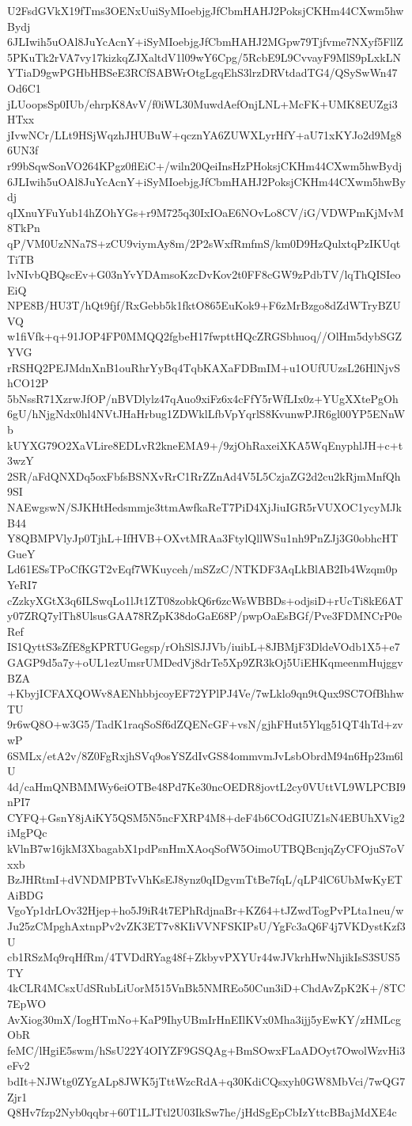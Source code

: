 U2FsdGVkX19fTms3OENxUuiSyMIoebjgJfCbmHAHJ2PoksjCKHm44CXwm5hwBydj
6JLIwih5uOAl8JuYcAcnY+iSyMIoebjgJfCbmHAHJ2MGpw79Tjfvme7NXyf5FllZ
5PKuTk2rVA7vy17kizkqZJXaltdV1l09wY6Cpg/5RcbE9L9CvvayF9MlS9pLxkLN
YTiaD9gwPGHbHBSeE3RCfSABWrOtgLgqEhS3lrzDRVtdadTG4/QSySwWn47Od6C1
jLUoopsSp0IUb/ehrpK8AvV/f0iWL30MuwdAefOnjLNL+McFK+UMK8EUZgi3HTxx
jIvwNCr/LLt9HSjWqzhJHUBuW+qcznYA6ZUWXLyrHfY+aU71xKYJo2d9Mg86UN3f
r99bSqwSonVO264KPgz0flEiC+/wiln20QeiInsHzPHoksjCKHm44CXwm5hwBydj
6JLIwih5uOAl8JuYcAcnY+iSyMIoebjgJfCbmHAHJ2PoksjCKHm44CXwm5hwBydj
qIXnuYFuYub14hZOhYGs+r9M725q30IxIOaE6NOvLo8CV/iG/VDWPmKjMvM8TkPn
qP/VM0UzNNa7S+zCU9viymAy8m/2P2sWxfRmfmS/km0D9HzQulxtqPzIKUqtTiTB
lvNIvbQBQscEv+G03nYvYDAmsoKzcDvKov2t0FF8cGW9zPdbTV/lqThQISIeoEiQ
NPE8B/HU3T/hQt9fjf/RxGebb5k1fktO865EuKok9+F6zMrBzgo8dZdWTryBZUVQ
w1fiVfk+q+91JOP4FP0MMQQ2fgbeH17fwpttHQcZRGSbhuoq//OlHm5dybSGZYVG
rRSHQ2PEJMdnXnB1ouRhrYyBq4TqbKAXaFDBmIM+u1OUfUUzsL26HlNjvShCO12P
5bNssR71XzrwJfOP/nBVDlylz47qAuo9xiFz6x4cFfY5rWfLIx0z+YUgXXtePgOh
6gU/hNjgNdx0hl4NVtJHaHrbug1ZDWklLfbVpYqrlS8KvunwPJR6gl00YP5ENnWb
kUYXG79O2XaVLire8EDLvR2kneEMA9+/9zjOhRaxeiXKA5WqEnyphlJH+c+t3wzY
2SR/aFdQNXDq5oxFbfsBSNXvRrC1RrZZnAd4V5L5CzjaZG2d2cu2kRjmMnfQh9SI
NAEwgswN/SJKHtHedsmmje3ttmAwfkaReT7PiD4XjJiuIGR5rVUXOC1ycyMJkB44
Y8QBMPVlyJp0TjhL+IfHVB+OXvtMRAa3FtylQllWSu1nh9PnZJj3G0obhcHTGueY
Ld61ESsTPoCfKGT2vEqf7WKuyceh/mSZzC/NTKDF3AqLkBlAB2Ib4Wzqm0pYeRI7
cZzkyXGtX3q6ILSwqLo1lJt1ZT08zobkQ6r6zcWsWBBDs+odjsiD+rUcTi8kE6AT
y07ZRQ7ylTh8UlsusGAA78RZpK38doGaE68P/pwpOaEsBGf/Pve3FDMNCrP0eRef
IS1QyttS3sZfE8gKPRTUGegsp/rOhSlSJJVb/iuibL+8JBMjF3DldeVOdb1X5+e7
GAGP9d5a7y+oUL1ezUmsrUMDedVj8drTe5Xp9ZR3kOj5UiEHKqmeenmHujggvBZA
+KbyjICFAXQOWv8AENhbbjcoyEF72YPlPJ4Ve/7wLklo9qn9tQux9SC7OfBhhwTU
9r6wQ8O+w3G5/TadK1raqSoSf6dZQENcGF+vsN/gjhFHut5Ylqg51QT4hTd+zvwP
6SMLx/etA2v/8Z0FgRxjhSVq9osYSZdIvGS84ommvmJvLsbObrdM94n6Hp23m6lU
4d/caHmQNBMMWy6eiOTBe48Pd7Ke30ncOEDR8jovtL2cy0VUttVL9WLPCBI9nPI7
CYFQ+GsnY8jAiKY5QSM5N5ncFXRP4M8+deF4b6COdGIUZ1sN4EBUhXVig2iMgPQc
kVlnB7w16jkM3XbagabX1pdPsnHmXAoqSofW5OimoUTBQBcnjqZyCFOjuS7oVxxb
BzJHRtmI+dVNDMPBTvVhKsEJ8ynz0qIDgvmTtBe7fqL/qLP4lC6UbMwKyETAiBDG
VgoYp1drLOv32Hjep+ho5J9iR4t7EPhRdjnaBr+KZ64+tJZwdTogPvPLta1neu/w
Ju25zCMpghAxtnpPv2vZK3ET7v8KIiVVNFSKIPsU/YgFc3aQ6F4j7VKDystKzf3U
cb1RSzMq9rqHfRm/4TVDdRYag48f+ZkbyvPXYUr44wJVkrhHwNhjikIsS3SUS5TY
4kCLR4MCsxUdSRubLiUorM515VnBk5NMREo50Cun3iD+ChdAvZpK2K+/8TC7EpWO
AvXiog30mX/IogHTmNo+KaP9IhyUBmIrHnEIlKVx0Mha3ijj5yEwKY/zHMLcgObR
feMC/lHgiE5swm/hSsU22Y4OIYZF9GSQAg+BmSOwxFLaADOyt7OwolWzvHi3eFv2
bdIt+NJWtg0ZYgALp8JWK5jTttWzcRdA+q30KdiCQsxyh0GW8MbVci/7wQG7Zjr1
Q8Hv7fzp2Nyb0qqbr+60T1LJTtl2U03IkSw7he/jHdSgEpCbIzYttcBBajMdXE4c
